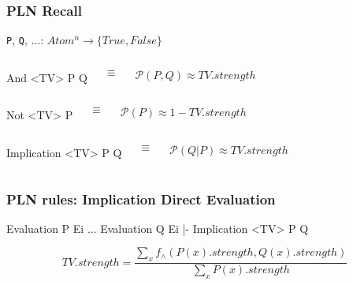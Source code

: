 \documentclass[aspectratio=169]{beamer}
\begin{document}
\begin{frame}[fragile]
  \frametitle{PLN Recall}

\texttt{P}, \texttt{Q}, $\hdots$: $Atom^n \rightarrow \{True, False\}$

  \begin{columns}
    \column{1in}

\begin{semiverbatim}
  And <TV>
    P
    Q
\end{semiverbatim}

    \column{0.5in}
    $$\equiv$$

    \column{1in}
    $$\mathcal{P}(P,Q) \approx TV.strength$$

  \end{columns}

  \begin{columns}
    \column{1in}

\begin{semiverbatim}
  Not <TV>
    P
\end{semiverbatim}

    \column{0.5in}
    $$\equiv$$

    \column{1in}
    $$\mathcal{P}(P) \approx 1 - TV.strength$$

  \end{columns}

  \begin{columns}
    \column{1in}

\begin{semiverbatim}
  Implication <TV>
    P
    Q
\end{semiverbatim}

    \column{0.5in}
    $$\equiv$$

    \column{1in}
    $$\mathcal{P}(Q|P) \approx TV.strength$$

  \end{columns}

\end{frame}

\begin{frame}[fragile]

  \frametitle{PLN rules: Implication Direct Evaluation}
\begin{semiverbatim}
Evaluation
  P
  Ei
...
Evaluation
  Q
  Ei
|-
Implication <TV>
  P
  Q
\end{semiverbatim}



$$TV.strength = \frac{\sum_x f_\wedge(P(x).strength, Q(x).strength)}{\sum_x P(x).strength}$$
\end{frame}
\end{document}
